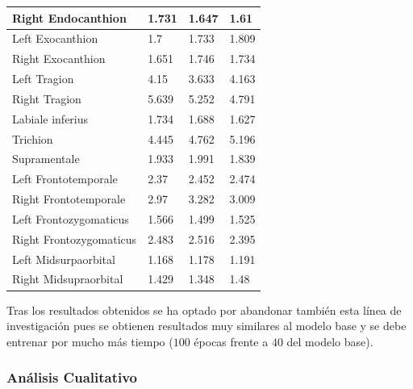 \begin{table}[!ht]
\begin{tabular}{|l|l|l|l|}
                Right Endocanthion & 1.731 & 1.647 & \cellcolor{green!25}1.61 \\ \hline
                Left Exocanthion & \cellcolor{green!25}1.7 & 1.733 & 1.809 \\ \hline
                Right Exocanthion & \cellcolor{green!25}1.651 & 1.746 & 1.734 \\ \hline
                Left Tragion & 4.15 & \cellcolor{green!25}3.633 & 4.163 \\ \hline
                Right Tragion & 5.639 & 5.252 & \cellcolor{green!25}4.791 \\ \hline
                Labiale inferius & 1.734 & 1.688 & \cellcolor{green!25}1.627 \\ \hline
                Trichion & \cellcolor{green!25}4.445 & 4.762 & 5.196 \\ \hline
                Supramentale & 1.933 & 1.991 & \cellcolor{green!25}1.839 \\ \hline
                Left Frontotemporale & \cellcolor{green!25}2.37 & 2.452 & 2.474 \\ \hline
                Right Frontotemporale & \cellcolor{green!25}2.97 & 3.282 & 3.009 \\ \hline
                Left Frontozygomaticus & 1.566 & \cellcolor{green!25}1.499 & 1.525 \\ \hline
                Right Frontozygomaticus & 2.483 & 2.516 & \cellcolor{green!25}2.395 \\ \hline
                Left Midsurpaorbital & \cellcolor{green!25}1.168 & 1.178 & 1.191 \\ \hline
                Right Midsupraorbital & 1.429 & \cellcolor{green!25}1.348 & 1.48 \\ \hline
            \end{tabular}
            \label{table:Decoder_landmarksresume}
        \end{table}
        
        \medskip

        \noindent Tras los resultados obtenidos se ha optado por abandonar también esta línea de investigación pues se obtienen resultados muy similares al modelo base y se debe entrenar por mucho más tiempo ($100$ épocas frente a $40$ del modelo base). 
        
        \subsubsection*{Análisis Cualitativo}
        
